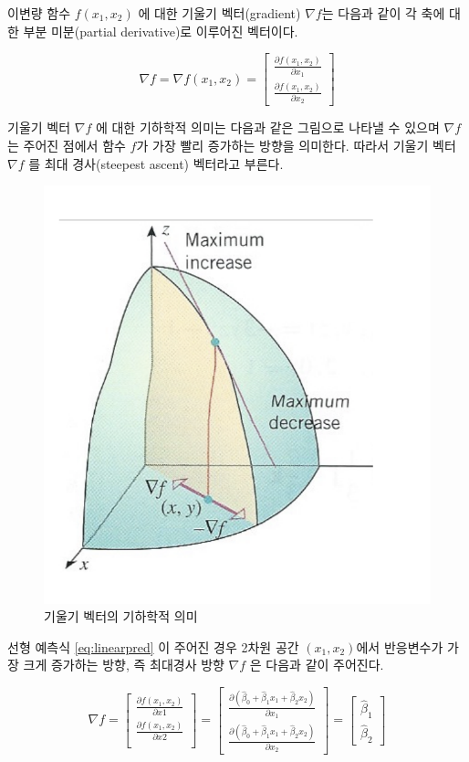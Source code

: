 \documentclass[
]{book}
\newcommand{\pardiff}[2]{\frac{\partial #1}{\partial #2 }}
\theoremstyle{definition}
\theoremstyle{definition}
\theoremstyle{definition}
\theoremstyle{definition}
\theoremstyle{remark}
\begin{document}
이변량 함수 \(f(x_1, x_2)\) 에 대한 기울기 벡터(gradient) \(\nabla f\)는
다음과 같이 각 축에 대한 부분 미분(partial derivative)로 이루어진 벡터이다.

\begin{equation*}
\nabla f  =  \nabla f (x_1, x_2)  =
\begin{bmatrix} 
\pardiff{f(x_1, x_2)}{x_1} \\
\pardiff{f(x_1, x_2)}{x_2} 
\end{bmatrix}
\end{equation*}

기울기 벡터 \(\nabla f\) 에 대한 기하학적 의미는 다음과 같은 그림으로 나타낼 수 있으며 \(\nabla f\)는 주어진 점에서
함수 \(f\)가 가장 빨리 증가하는 방향을 의미한다. 따라서 기울기 벡터 \(\nabla f\) 를 최대 경사(steepest ascent) 벡터라고 부른다.

\begin{figure}

{\centering \includegraphics[width=0.7\linewidth]{myimages/gradient2} 

}

\caption{기울기 벡터의 기하학적 의미}\label{fig:unnamed-chunk-7}
\end{figure}

선형 예측식 \eqref{eq:linearpred} 이 주어진 경우 2차원 공간 \((x_1, x_2)\)에서 반응변수가 가장 크게 증가하는
방향, 즉 최대경사 방향 \(\nabla f\) 은 다음과 같이 주어진다.

\begin{equation}
\nabla f = 
\begin{bmatrix} 
\pardiff{f(x_1, x_2)}{x1} \\
\pardiff{f(x_1, x_2)}{x2} \\
\end{bmatrix}
=
\begin{bmatrix} 
\pardiff{(\hat \beta_0 + \hat \beta_1 x_1 + \hat \beta_2 x_2)}{x_1} \\
\pardiff{(\hat \beta_0 + \hat \beta_1 x_1 + \hat \beta_2 x_2)}{x_2} 
\end{bmatrix} 
=
\begin{bmatrix} 
\hat \beta_1  \\
\hat \beta_2 
\end{bmatrix}
\label{eq:steepacend}
\end{equation}
\end{document}
